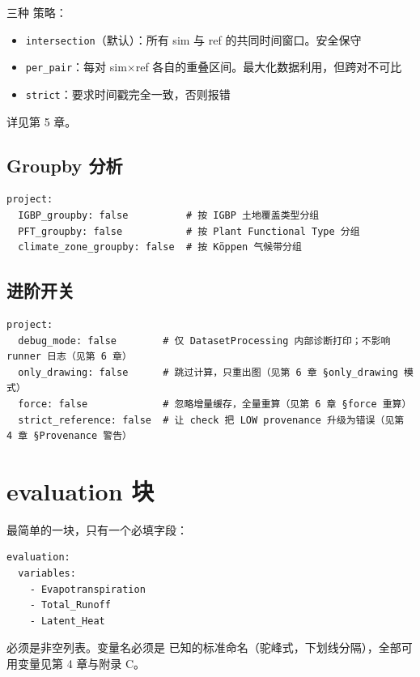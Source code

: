 三种  策略：

\begin{itemize}
  \item \texttt{intersection}（默认）：所有 sim 与 ref 的共同时间窗口。安全保守
  \item \texttt{per_pair}：每对 sim×ref 各自的重叠区间。最大化数据利用，但跨对不可比
  \item \texttt{strict}：要求时间戳完全一致，否则报错
\end{itemize}

详见第 5 章。

\subsection{Groupby 分析}

\begin{verbatim}
project:
  IGBP_groupby: false          # 按 IGBP 土地覆盖类型分组
  PFT_groupby: false           # 按 Plant Functional Type 分组
  climate_zone_groupby: false  # 按 Köppen 气候带分组
\end{verbatim}

\subsection{进阶开关}

\begin{verbatim}
project:
  debug_mode: false        # 仅 DatasetProcessing 内部诊断打印；不影响 runner 日志（见第 6 章）
  only_drawing: false      # 跳过计算，只重出图（见第 6 章 §only_drawing 模式）
  force: false             # 忽略增量缓存，全量重算（见第 6 章 §force 重算）
  strict_reference: false  # 让 check 把 LOW provenance 升级为错误（见第 4 章 §Provenance 警告）
\end{verbatim}

\section{evaluation 块}

最简单的一块，只有一个必填字段：

\begin{verbatim}
evaluation:
  variables:
    - Evapotranspiration
    - Total_Runoff
    - Latent_Heat
\end{verbatim}

 必须是非空列表。变量名必须是 \openbench{} 已知的标准命名（驼峰式，下划线分隔），全部可用变量见第 4 章与附录 C。

